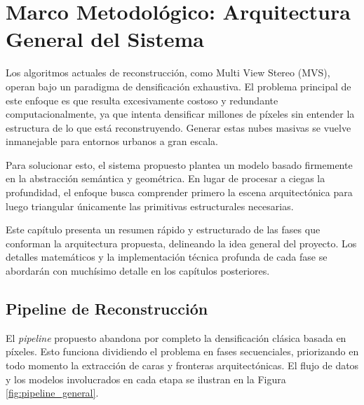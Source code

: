 \chapter{Marco Metodológico: Arquitectura General del Sistema}

Los algoritmos actuales de reconstrucción, como Multi View Stereo (MVS), operan bajo un paradigma de densificación exhaustiva. El problema principal de este enfoque es que resulta excesivamente costoso y redundante computacionalmente, ya que intenta densificar millones de píxeles sin entender la estructura de lo que está reconstruyendo. Generar estas nubes masivas se vuelve inmanejable para entornos urbanos a gran escala.

Para solucionar esto, el sistema propuesto plantea un modelo basado firmemente en la abstracción semántica y geométrica. En lugar de procesar a ciegas la profundidad, el enfoque busca comprender primero la escena arquitectónica para luego triangular únicamente las primitivas estructurales necesarias. 

Este capítulo presenta un resumen rápido y estructurado de las fases que conforman la arquitectura propuesta, delineando la idea general del proyecto. Los detalles matemáticos y la implementación técnica profunda de cada fase se abordarán con muchísimo detalle en los capítulos posteriores.

\section{Pipeline de Reconstrucción}
El \textit{pipeline} propuesto abandona por completo la densificación clásica basada en píxeles. Esto funciona dividiendo el problema en fases secuenciales, priorizando en todo momento la extracción de caras y fronteras arquitectónicas. El flujo de datos y los modelos involucrados en cada etapa se ilustran en la Figura \ref{fig:pipeline_general}.

